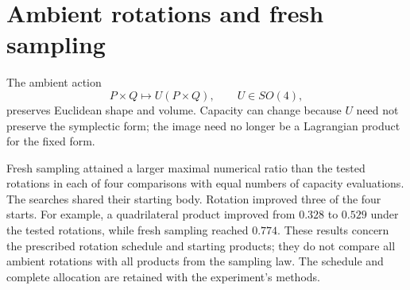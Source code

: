 \section{Ambient rotations and fresh sampling}
\label{app:trial-ambient}

The ambient action
\[
 P\times Q\longmapsto U(P\times Q),\qquad U\in SO(4),
\]
preserves Euclidean shape and volume. Capacity can change because $U$
need not preserve the symplectic form; the image need no longer be a
Lagrangian product for the fixed form.

Fresh sampling attained a larger maximal numerical ratio than the tested
rotations in each of four comparisons with equal numbers of capacity
evaluations. The searches shared their starting body. Rotation improved
three of the four starts. For example, a quadrilateral product improved
from $0.328$ to $0.529$ under the tested rotations, while fresh sampling
reached $0.774$. These results concern the prescribed rotation schedule
and starting products; they do not compare all ambient rotations with all
products from the sampling law. The schedule and complete allocation are
retained with the experiment's methods.
